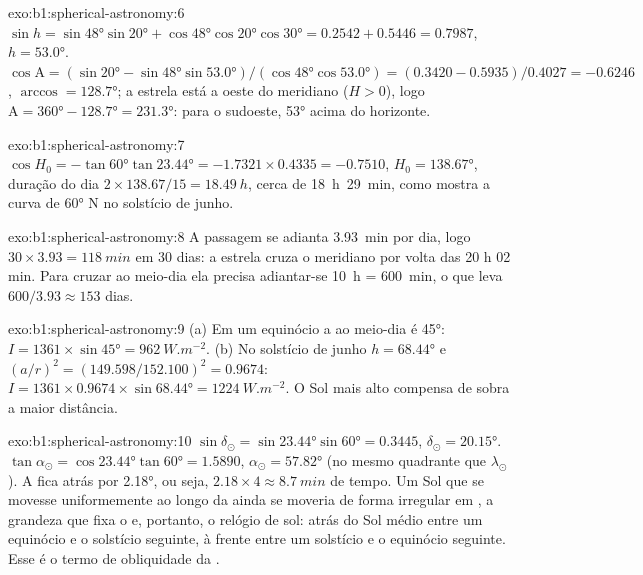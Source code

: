 \begin{solution}{exo:b1:spherical-astronomy:6}
$\sin h = \sin\ang{48}\sin\ang{20} + \cos\ang{48}\cos\ang{20}\cos\ang{30}
= 0.2542 + 0.5446 = 0.7987$, $h = \ang{53.0}$.
$\cos\mathrm{A} = (\sin\ang{20} - \sin\ang{48}\sin\ang{53.0})/(\cos\ang{48}
\cos\ang{53.0}) = (0.3420 - 0.5935)/0.4027 = -0.6246$, $\arccos = \ang{128.7}$;
a estrela está a oeste do meridiano ($H > 0$), logo $\mathrm{A} = \ang{360} -
\ang{128.7} = \ang{231.3}$: para o sudoeste, \ang{53} acima do horizonte.
\end{solution}

\begin{solution}{exo:b1:spherical-astronomy:7}
$\cos H_0 = -\tan\ang{60}\tan\ang{23.44} = -1.7321\times0.4335 = -0.7510$,
$H_0 = \ang{138.67}$, duração do dia $2\times138.67/15 = \qty{18.49}{h}$, cerca de
\qty{18}{h}~\qty{29}{min}, como mostra a curva de \ang{60} N no solstício de junho.
\end{solution}

\begin{solution}{exo:b1:spherical-astronomy:8}
A passagem se adianta \qty{3.93}{min} por dia, logo $30\times3.93 =
\qty{118}{min}$ em 30 dias: a estrela cruza o meridiano por volta das 20 h 02 min. Para cruzar ao
meio-dia ela precisa adiantar-se \qty{10}{h} = \qty{600}{min}, o que leva
$600/3.93 \approx 153$ dias.
\end{solution}

\begin{solution}{exo:b1:spherical-astronomy:9}
(a) Em um equinócio a  ao meio-dia é \ang{45}: $I = 1361\times\sin\ang{45}
= \qty{962}{W.m^{-2}}$. (b) No solstício de junho $h = \ang{68.44}$ e
$(a/r)^2 = (149.598/152.100)^2 = 0.9674$:
$I = 1361\times0.9674\times\sin\ang{68.44} = \qty{1224}{W.m^{-2}}$. O Sol mais
alto compensa de sobra a maior distância.
\end{solution}

\begin{solution}{exo:b1:spherical-astronomy:10}
$\sin\delta_\odot = \sin\ang{23.44}\sin\ang{60} = 0.3445$,
$\delta_\odot = \ang{20.15}$. $\tan\alpha_\odot = \cos\ang{23.44}\tan\ang{60}
= 1.5890$, $\alpha_\odot = \ang{57.82}$ (no mesmo quadrante que $\lambda_\odot$).
A  fica atrás por \ang{2.18}, ou seja, $2.18\times4 \approx
\qty{8.7}{min}$ de tempo. Um Sol que se movesse uniformemente ao longo da  ainda se moveria de forma irregular em , a grandeza que fixa o  e, portanto, o relógio de sol: atrás do Sol médio entre um equinócio e o solstício seguinte, à frente entre um solstício e o equinócio seguinte. Esse é o termo de obliquidade da .
\end{solution}

